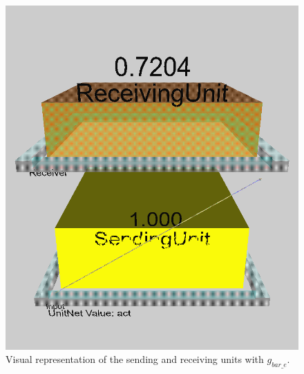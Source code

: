 \newpage
\begin{multicols}{2}
\begin{figure}[H]
\centering
\includegraphics[scale=0.225]{Media/Main/EQ1/2.1.A.png}
\caption{Visual representation of the sending and receiving units with $g_{bar\_e}$.}
\label{Q2.1 - 0.4}
\end{figure}


\end{multicols}
